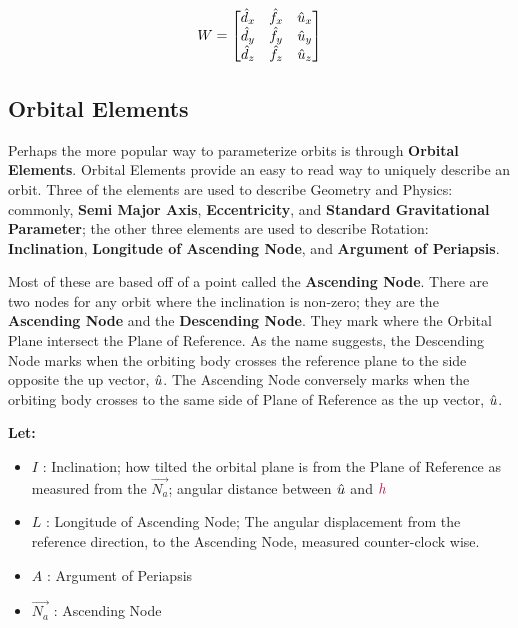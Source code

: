 		$$W = 
		\begin{bmatrix}
		\hat{d}_x & \hat{f}_x & \hat{u}_x \\
		\hat{d}_y & \hat{f}_y & \hat{u}_y \\
		\hat{d}_z & \hat{f}_z & \hat{u}_z
		\end{bmatrix}				
		$$
		
	\subsection{Orbital Elements}
		Perhaps the more popular way to parameterize orbits is through \textbf{Orbital Elements}. Orbital Elements provide an easy to read way to uniquely describe an orbit. Three of the elements are used to describe Geometry and Physics: commonly, \textbf{Semi Major Axis}, \textbf{Eccentricity}, and \textbf{Standard Gravitational Parameter}; the other three elements are used to describe Rotation: \textbf{Inclination}, \textbf{Longitude of Ascending Node}, and \textbf{Argument of Periapsis}.
		
		Most of these are based off of a point called the \textbf{Ascending Node}. There are two nodes for any orbit where the inclination is non-zero; they are the \textbf{Ascending Node} and the \textbf{Descending Node}. They mark where the Orbital Plane intersect the Plane of Reference. As the name suggests, the Descending Node marks when the orbiting body crosses the reference plane to the side opposite the up vector, $\hat{u}$. The Ascending Node conversely marks when the orbiting body crosses to the same side of Plane of Reference as the up vector, $\hat{u}$.
		
		\newcommand{\na}{\vec{N_a}} %
		\newcommand{\inc}{I} %
		\newcommand{\ap}{A}  %
		\newcommand{\lan}{L} %
		\textbf{Let: }
		\begin{itemize}
		 	\item $\inc$ : Inclination; how tilted the orbital plane is from the Plane of Reference as measured from the $\na$; angular distance between $\hat{u}$ and $\textcolor{purple}{h}$
		 	\item $\lan$ : Longitude of Ascending Node; The angular displacement from the reference direction, to the Ascending Node, measured counter-clock wise. 
		 	\item $\ap$  : Argument of Periapsis
			\item $\na$  : Ascending Node
		\end{itemize}
		 
